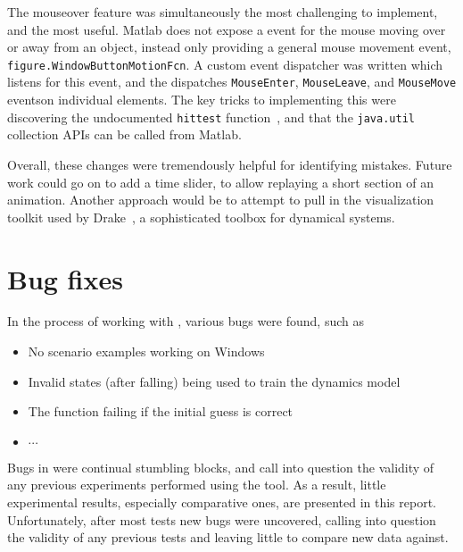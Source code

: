 \documentclass[main.tex]{subfiles}
\begin{document}
	The mouseover feature was simultaneously the most challenging to implement, and the most useful.
	Matlab does not expose a event for the mouse moving over or away from an object, instead only providing a general mouse movement event, \texttt{figure.WindowButtonMotionFcn}.
	A custom event dispatcher was written which listens for this event, and the dispatches \texttt{MouseEnter}, \texttt{MouseLeave}, and \texttt{MouseMove} events\footnotemark on individual elements.
	The key tricks to implementing this were discovering the undocumented \texttt{hittest} function~\cite{matlab-hittest}, and that the \texttt{java.util} collection APIs can be called from Matlab.


	Overall, these changes were tremendously helpful for identifying mistakes.
	Future work could go on to add a time slider, to allow replaying a short section of an animation. Another approach would be to attempt to pull in the visualization toolkit used by Drake~\cite{drake}, a sophisticated toolbox for dynamical systems.


\section{Bug fixes}

	In the process of working with {\Pilco}, various bugs were found, such as
	\begin{itemize}
		\item No scenario examples working on Windows
		\item Invalid states (after falling) being used to train the dynamics model
		\item The  function failing if the initial guess is correct
		\item $\cdots$
	\end{itemize}
	Bugs in {\Pilco} were continual stumbling blocks, and call into question the validity of any previous experiments performed using the tool.
	As a result, little experimental results, especially comparative ones, are presented in this report.
	Unfortunately, after most tests new bugs were uncovered, calling into question the validity of any previous tests and leaving little to compare new data against.


\bib
\end{document}
